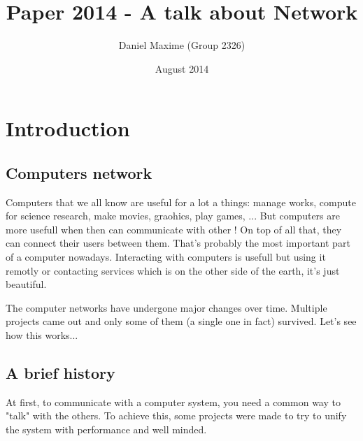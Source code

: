 \documentclass{article}
\title{Paper 2014 - A talk about Network}
\author{Daniel Maxime (Group 2326)}
\date{August 2014}
\begin{document}
\maketitle
\newpage

\tableofcontents
\clearpage

%
% 
% 
% 
%


\section{Introduction}
	\subsection{Computers network}
	
	Computers that we all know are useful for a lot a things: manage works, compute for science research,
	make movies, graohics, play games, ... But computers are more usefull when then can communicate with other !
	On top of all that, they can connect their users between them. That's probably the most important part of a
	computer nowadays. Interacting with computers is usefull but using it remotly or contacting services which
	is on the other side of the earth, it's just beautiful.
	
	The computer networks have undergone major changes over time. Multiple projects came out and
	only some of them (a single one in fact) survived. Let's see how this works...
	
	\subsection{A brief history}
	
	At first, to communicate with a computer system, you need a common way to "talk" with the others. To achieve
	this, some projects were made to try to unify the system with performance and well minded.
	
\end{document}
